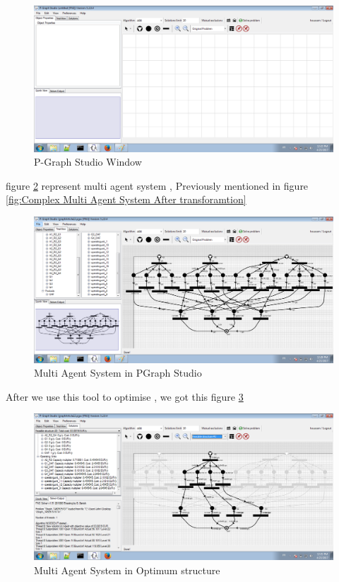 \begin{figure}[th]
	\centering  %
 	\includegraphics[scale=0.44]{Chapiter3/img/pgraph}
	\caption{\label{fig:pgraphstudio)}P-Graph Studio Window }
\end{figure}  


figure \ref{fig:Multi Agent System in PGraph Studio} represent multi agent system , Previously mentioned in figure \ref{fig:Complex Multi Agent System After transforamtion} 
\begin{figure}[th]
	\centering
		\includegraphics[scale=0.44]{Chapiter3/img/pgraphArt}
	\caption{\label{fig:Multi Agent System in PGraph Studio}Multi Agent System in PGraph Studio}
\end{figure} 
\pagebreak
After we use this tool to optimise , we got this figure \ref{fig:Multi Agent System in Optimum structure}

\begin{figure}[th]
	\centering
		\includegraphics[scale=0.44]{Chapiter3/img/pgraphSol}
	\caption{\label{fig:Multi Agent System in Optimum structure}Multi Agent System in Optimum structure}
\end{figure} 

